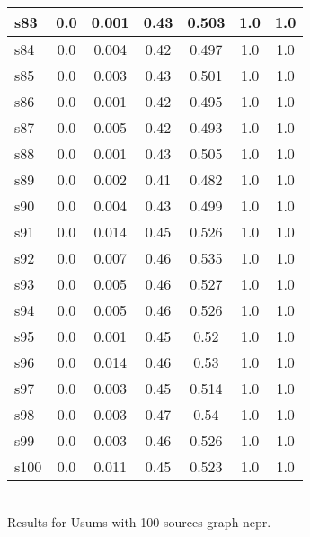 \documentclass{article}
\begin{document}
\begin{tabular}{|l|c|c|c|c|c|c|}
s83 &0.0 & 0.001 & 0.43 & 0.503 & 1.0 & 1.0\\
\hline
s84 &0.0 & 0.004 & 0.42 & 0.497 & 1.0 & 1.0\\
\hline
s85 &0.0 & 0.003 & 0.43 & 0.501 & 1.0 & 1.0\\
\hline
s86 &0.0 & 0.001 & 0.42 & 0.495 & 1.0 & 1.0\\
\hline
s87 &0.0 & 0.005 & 0.42 & 0.493 & 1.0 & 1.0\\
\hline
s88 &0.0 & 0.001 & 0.43 & 0.505 & 1.0 & 1.0\\
\hline
s89 &0.0 & 0.002 & 0.41 & 0.482 & 1.0 & 1.0\\
\hline
s90 &0.0 & 0.004 & 0.43 & 0.499 & 1.0 & 1.0\\
\hline
s91 &0.0 & 0.014 & 0.45 & 0.526 & 1.0 & 1.0\\
\hline
s92 &0.0 & 0.007 & 0.46 & 0.535 & 1.0 & 1.0\\
\hline
s93 &0.0 & 0.005 & 0.46 & 0.527 & 1.0 & 1.0\\
\hline
s94 &0.0 & 0.005 & 0.46 & 0.526 & 1.0 & 1.0\\
\hline
s95 &0.0 & 0.001 & 0.45 & 0.52 & 1.0 & 1.0\\
\hline
s96 &0.0 & 0.014 & 0.46 & 0.53 & 1.0 & 1.0\\
\hline
s97 &0.0 & 0.003 & 0.45 & 0.514 & 1.0 & 1.0\\
\hline
s98 &0.0 & 0.003 & 0.47 & 0.54 & 1.0 & 1.0\\
\hline
s99 &0.0 & 0.003 & 0.46 & 0.526 & 1.0 & 1.0\\
\hline
s100 &0.0 & 0.011 & 0.45 & 0.523 & 1.0 & 1.0\\
\hline
\end{tabular}\\

\noindent Results for Usums with 100 sources graph ncpr.
\end{document}
